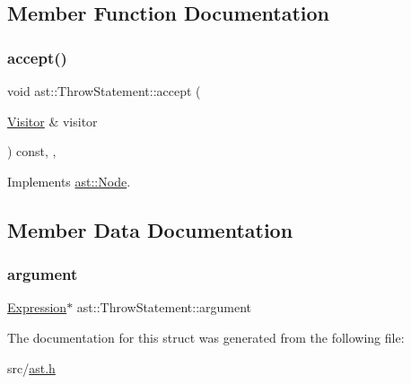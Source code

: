 \subsection{Member Function Documentation}
\mbox{\label{structast_1_1_throw_statement_ae653fa62092ea18ce6c16eee1018aa4d}} 
\subsubsection{\texorpdfstring{accept()}{accept()}}
{\footnotesize\ttfamily void ast\+::\+Throw\+Statement\+::accept (\begin{DoxyParamCaption}\item[{\hyperlink{structast_1_1_visitor}{Visitor} \&}]{visitor }\end{DoxyParamCaption}) const\hspace{0.3cm}{\ttfamily [inline]}, {\ttfamily [override]}, {\ttfamily [virtual]}}



Implements \hyperlink{structast_1_1_node_abc089ee6caaf06a4445ebdd8391fdebc}{ast\+::\+Node}.



\subsection{Member Data Documentation}
\mbox{\label{structast_1_1_throw_statement_ad481e5ceab6c253642c489346dde3281}} 
\subsubsection{\texorpdfstring{argument}{argument}}
{\footnotesize\ttfamily \hyperlink{structast_1_1_expression}{Expression}$\ast$ ast\+::\+Throw\+Statement\+::argument}



The documentation for this struct was generated from the following file\+:\begin{DoxyCompactItemize}
\item 
src/\hyperlink{ast_8h}{ast.\+h}\end{DoxyCompactItemize}
